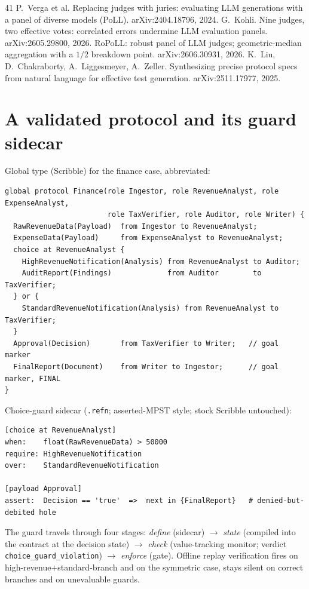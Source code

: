 \documentclass{article}
\begin{document}
\begin{thebibliography}{41}
 P.~Verga et al. Replacing judges with juries: evaluating LLM generations with a panel of diverse models (PoLL). arXiv:2404.18796, 2024.
 G.~Kohli. Nine judges, two effective votes: correlated errors undermine LLM evaluation panels. arXiv:2605.29800, 2026.
 RoPoLL: robust panel of LLM judges; geometric-median aggregation with a $1/2$ breakdown point. arXiv:2606.30931, 2026.
 K.~Liu, D.~Chakraborty, A.~Liggesmeyer, A.~Zeller. Synthesizing precise protocol specs from natural language for effective test generation. arXiv:2511.17977, 2025.
\end{thebibliography}

\appendix
\section{A validated protocol and its guard sidecar}\label{app:scr}
Global type (Scribble) for the finance case, abbreviated:
{\small\begin{verbatim}
global protocol Finance(role Ingestor, role RevenueAnalyst, role ExpenseAnalyst,
                        role TaxVerifier, role Auditor, role Writer) {
  RawRevenueData(Payload)  from Ingestor to RevenueAnalyst;
  ExpenseData(Payload)     from ExpenseAnalyst to RevenueAnalyst;
  choice at RevenueAnalyst {
    HighRevenueNotification(Analysis) from RevenueAnalyst to Auditor;
    AuditReport(Findings)             from Auditor        to TaxVerifier;
  } or {
    StandardRevenueNotification(Analysis) from RevenueAnalyst to TaxVerifier;
  }
  Approval(Decision)       from TaxVerifier to Writer;   // goal marker
  FinalReport(Document)    from Writer to Ingestor;      // goal marker, FINAL
}
\end{verbatim}}
Choice-guard sidecar (\texttt{.refn}; asserted-MPST style; stock Scribble untouched):
{\small\begin{verbatim}
[choice at RevenueAnalyst]
when:    float(RawRevenueData) > 50000
require: HighRevenueNotification
over:    StandardRevenueNotification

[payload Approval]
assert:  Decision == 'true'  =>  next in {FinalReport}   # denied-but-debited hole
\end{verbatim}}
The guard travels through four stages: \emph{define} (sidecar) $\to$ \emph{state} (compiled into the contract at the decision state) $\to$ \emph{check} (value-tracking monitor; verdict \texttt{choice\_guard\_violation}) $\to$ \emph{enforce} (gate). Offline replay verification fires on high-revenue$+$standard-branch and on the symmetric case, stays silent on correct branches and on unevaluable guards.
\end{document}
